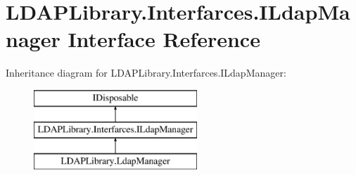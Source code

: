 \hypertarget{interface_l_d_a_p_library_1_1_interfarces_1_1_i_ldap_manager}{}\section{L\+D\+A\+P\+Library.\+Interfarces.\+I\+Ldap\+Manager Interface Reference}
\label{interface_l_d_a_p_library_1_1_interfarces_1_1_i_ldap_manager}
Inheritance diagram for L\+D\+A\+P\+Library.\+Interfarces.\+I\+Ldap\+Manager\+:\begin{figure}[H]
\begin{center}
\leavevmode
\includegraphics[height=3.000000cm]{interface_l_d_a_p_library_1_1_interfarces_1_1_i_ldap_manager}
\end{center}
\end{figure}

